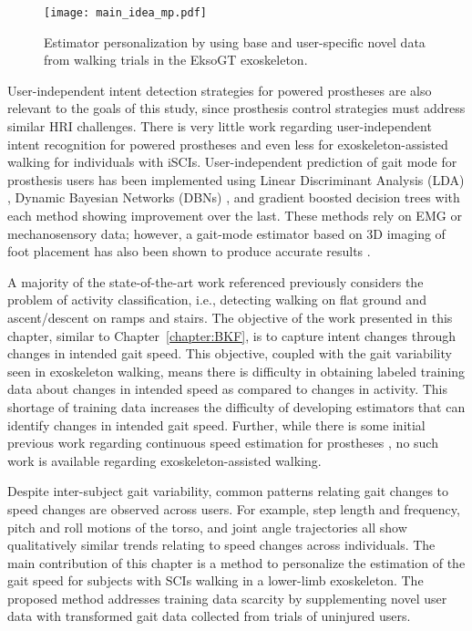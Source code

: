 \begin{figure}
	\centering
	\texttt{[image: main\_idea\_mp.pdf]}
	\caption{Estimator personalization by using base and user-specific novel data from walking trials in the EksoGT exoskeleton.}\label{fig:main_idea_mp}
\end{figure}

User-independent intent detection strategies for powered prostheses are also relevant to the goals of this study, since prosthesis control strategies must address similar HRI challenges. There is very little work regarding user-independent intent recognition for powered prostheses and even less for exoskeleton-assisted walking for individuals with iSCIs. User-independent prediction of gait mode for prosthesis users has been implemented using Linear Discriminant Analysis (LDA) \cite{young2013classifying}, Dynamic Bayesian Networks (DBNs) \cite{young2015classification}, and gradient boosted decision trees \cite{bhakta2020machine} with each method showing improvement over the last. These methods rely on EMG or mechanosensory data; however, a gait-mode estimator based on 3D imaging of foot placement has also been shown to produce accurate results \cite{massalin2017user}. 

A majority of the state-of-the-art work referenced previously considers the problem of activity classification, i.e., detecting walking on flat ground and ascent/descent on ramps and stairs. The objective of the work presented in this chapter, similar to Chapter~\ref{chapter:BKF}, is to capture intent changes through changes in intended gait speed. This objective, coupled with the gait variability seen in exoskeleton walking, means there is difficulty in obtaining labeled training data about changes in intended speed as compared to changes in activity. This shortage of training data increases the difficulty of developing estimators that can identify changes in intended gait speed. Further, while there is some initial previous work regarding continuous speed estimation for prostheses \cite{best2021phase}, no such work is available regarding exoskeleton-assisted walking.

Despite inter-subject gait variability, common patterns relating gait changes to speed changes are observed across users. For example, step length and frequency, pitch and roll motions of the torso, and joint angle trajectories all show qualitatively similar trends relating to speed changes across individuals. The main contribution of this chapter is a method to personalize the estimation of the gait speed for subjects with SCIs walking in a lower-limb exoskeleton. The proposed method addresses training data scarcity by supplementing novel user data with transformed gait data collected from trials of uninjured users. 

